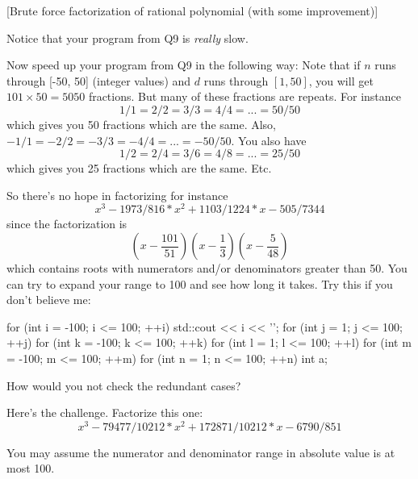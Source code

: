 [Brute force factorization of rational polynomial (with some improvement)]


Notice that your program from Q9 is \textit{really} slow.

Now speed up your program from Q9 in the following way:
Note that if $n$ runs through [-50, 50] (integer values)
and $d$ runs through $[1, 50]$, you will get $101 \times 50=5050$ fractions.
But many of these fractions are repeats.
For instance
\[
  1/1 = 2/2 = 3/3 = 4/4 = ... = 50/50
\]
which gives you 50 fractions which are the same.
Also, $-1/1 = -2/2 = -3/3 = -4/4 = ... = -50/50$. 
You also have
\[
  1/2 = 2/4 = 3/6 = 4/8 = ... = 25/50
\]
which gives you 25 fractions which are the same.
Etc.


So there's no hope in factorizing for instance
\[
x^3 - 1973/816*x^2 + 1103/1224*x - 505/7344
\]
since the factorization is
\[
  \left( x - \frac{101}{51} \right)
  \left( x - \frac{1}{3} \right)
  \left( x - \frac{5}{48} \right)
\]
which contains roots with numerators and/or denominators greater than 50.
You can try to expand your range to 100 and see how long it takes.
Try this if you don't believe me:
\begin{console}[fontsize=\scriptsize]
for (int i = -100; i <= 100; ++i)
{
    std::cout << i << '\n';
    for (int j = 1; j <= 100; ++j)
    {
        for (int k = -100; k <= 100; ++k)
        {
            for (int l = 1; l <= 100; ++l)
            {
                for (int m = -100; m <= 100; ++m)
                {
                    for (int n = 1; n <= 100; ++n)
                    {
                        int a;
                    }
                }
            }
        }
    }
}
\end{console}

How would you not check the redundant cases?


Here's the challenge. Factorize this one:
\[
  x^3 - 79477/10212*x^2 + 172871/10212*x - 6790/851
\]

You may assume the numerator and denominator range in absolute value is at most 100.

